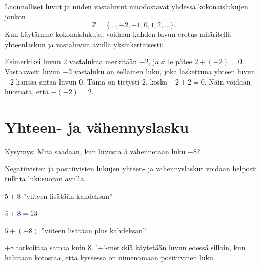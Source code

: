
Luonnolliset luvut ja niiden vastaluvut muodostavat yhdessä
kokonaislukujen joukon
\[\mathbb{Z} = \{\ldots, -2, -1, 0, 1, 2, \ldots\}.\]
Kun käytämme kokonaislukuja, voidaan kahden luvun erotus määritellä
yhteenlaskun ja vastaluvun avulla yksinkertaisesti:

\laatikko{
\[m-n = m+(-n)\]
}

    Esimerkiksi luvun $2$ vastalukua merkitään $-2$, ja sille pätee $2+(-2)=0$. Vastaavasti luvun $-2$ vastaluku on sellainen luku, joka laskettuna yhteen luvun $-2$ kanssa antaa luvun $0$. Tämä on tietysti $2$, koska $-2+2=0$. Näin voidaan huomata, että $-(-2)=2$.
    


\section{Yhteen- ja vähennyslasku}

    Kysymys: Mitä saadaan, kun luvusta $5$ vähennetään luku $-8$?
    
    Negatiivisten ja positiivisten lukujen yhteen- ja vähennyslaskut voidaan helposti tulkita lukusuoran avulla.
    
    
    $5+8$ ''viiteen lisätään kahdeksan''
    \begin{center}
      
      \begin{lukusuora}{-1}{14}{14}
        {\color{red} }
        \lukusuorauusi
        {\color{red} }
        {\color{blue} }
       \end{lukusuora}
       ${\color{red}5}+{\color{blue}8}=13$
    \end{center}
    
    $5+(+8)$ ''viiteen lisätään plus kahdeksan''
    
    $+8$ tarkoittaa samaa kuin $8$. '$+$'-merkkiä käytetään luvun edessä silloin, kun halutaan korostaa, että kyseessä on nimenomaan positiivinen luku.
    
    
